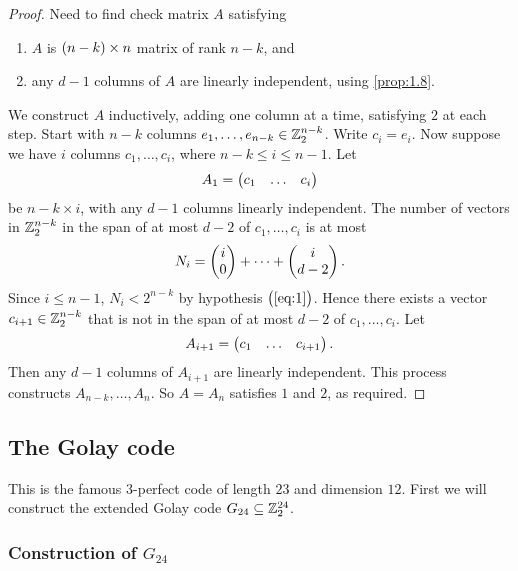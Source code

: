 \begin{proof}
Need to find check matrix $ A $ satisfying
\begin{enumerate}
\item $ A $ is $ \br{n - k} \times n $ matrix of rank $ n - k $, and
\item any $ d - 1 $ columns of $ A $ are linearly independent, using \ref{prop:1.8}.
\end{enumerate}
We construct $ A $ inductively, adding one column at a time, satisfying $ 2 $ at each step. Start with $ n - k $ columns $ e_1, \dots, e_{n - k} \in \mathbb{Z}_2^{n - k} $. Write $ c_i = e_i $. Now suppose we have $ i $ columns $ c_1, \dots, c_i $, where $ n - k \le i \le n - 1 $. Let
$$ A_1 = \onebythree{c_1}{\dots}{c_i} $$
be $ n - k \times i $, with any $ d - 1 $ columns linearly independent. The number of vectors in $ \mathbb{Z}_2^{n - k} $ in the span of at most $ d - 2 $ of $ c_1, \dots, c_i $ is at most
$$ N_i = \begin{pmatrix} i \\ 0 \end{pmatrix} + \dots + \begin{pmatrix} i \\ d - 2 \end{pmatrix}. $$
Since $ i \le n - 1 $, $ N_i < 2^{n - k} $ by hypothesis $ \br{\ref{eq:1}} $. Hence there exists a vector $ c_{i + 1} \in \mathbb{Z}_2^{n - k} $ that is not in the span of at most $ d - 2 $ of $ c_1, \dots, c_i $. Let
$$ A_{i + 1} = \onebythree{c_1}{\dots}{c_{i + 1}}. $$
Then any $ d - 1 $ columns of $ A_{i + 1} $ are linearly independent. This process constructs $ A_{n - k}, \dots, A_n $. So $ A = A_n $ satisfies $ 1 $ and $ 2 $, as required.
\end{proof}

\pagebreak

\subsection{The Golay code}


This is the famous $ 3 $-perfect code of length $ 23 $ and dimension $ 12 $. First we will construct the extended Golay code $ G_{24} \subseteq \mathbb{Z}_2^{24} $.

\subsubsection{Construction of $ G_{24} $}

